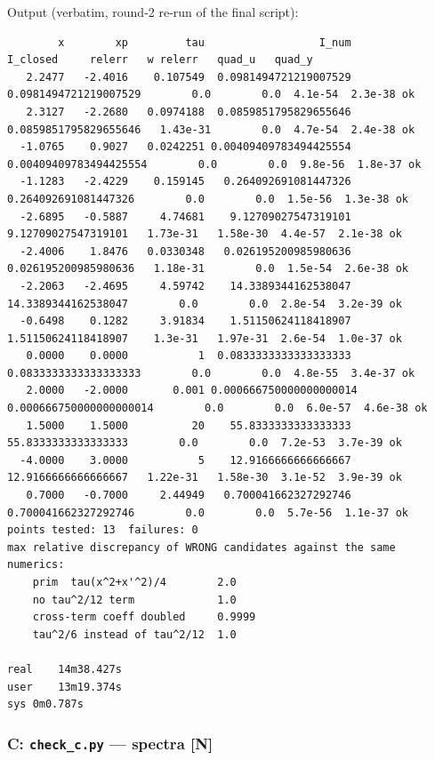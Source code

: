 \documentclass[11pt,a4paper]{article}
\begin{document}
Output (verbatim, round-2 re-run of the final script):

\begin{lstlisting}
        x        xp         tau                  I_num               I_closed     relerr   w relerr   quad_u   quad_y
   2.2477   -2.4016    0.107549  0.0981494721219007529  0.0981494721219007529        0.0        0.0  4.1e-54  2.3e-38 ok
   2.3127   -2.2680   0.0974188  0.0859851795829655646  0.0859851795829655646   1.43e-31        0.0  4.7e-54  2.4e-38 ok
  -1.0765    0.9027   0.0242251 0.00409409783494425554 0.00409409783494425554        0.0        0.0  9.8e-56  1.8e-37 ok
  -1.1283   -2.4229    0.159145   0.264092691081447326   0.264092691081447326        0.0        0.0  1.5e-56  1.3e-38 ok
  -2.6895   -0.5887     4.74681    9.12709027547319101    9.12709027547319101   1.73e-31   1.58e-30  4.4e-57  2.1e-38 ok
  -2.4006    1.8476   0.0330348   0.026195200985980636   0.026195200985980636   1.18e-31        0.0  1.5e-54  2.6e-38 ok
  -2.2063   -2.4695     4.59742    14.3389344162538047    14.3389344162538047        0.0        0.0  2.8e-54  3.2e-39 ok
  -0.6498    0.1282     3.91834    1.51150624118418907    1.51150624118418907    1.3e-31   1.97e-31  2.6e-54  1.0e-37 ok
   0.0000    0.0000           1  0.0833333333333333333  0.0833333333333333333        0.0        0.0  4.8e-55  3.4e-37 ok
   2.0000   -2.0000       0.001 0.000666750000000000014 0.000666750000000000014        0.0        0.0  6.0e-57  4.6e-38 ok
   1.5000    1.5000          20    55.8333333333333333    55.8333333333333333        0.0        0.0  7.2e-53  3.7e-39 ok
  -4.0000    3.0000           5    12.9166666666666667    12.9166666666666667   1.22e-31   1.58e-30  3.1e-52  3.9e-39 ok
   0.7000   -0.7000     2.44949   0.700041662327292746   0.700041662327292746        0.0        0.0  5.7e-56  1.1e-37 ok
points tested: 13  failures: 0
max relative discrepancy of WRONG candidates against the same numerics:
    prim  tau(x^2+x'^2)/4        2.0
    no tau^2/12 term             1.0
    cross-term coeff doubled     0.9999
    tau^2/6 instead of tau^2/12  1.0

real    14m38.427s
user    13m19.374s
sys 0m0.787s
\end{lstlisting}

\hypertarget{c-check_c.py-spectra-n}{%
\subsubsection{\texorpdfstring{C: \texttt{check\_c.py} --- spectra
{[}N{]}}{C: check\_c.py --- spectra {[}N{]}}}\label{c-check_c.py-spectra-n}}
\end{document}
